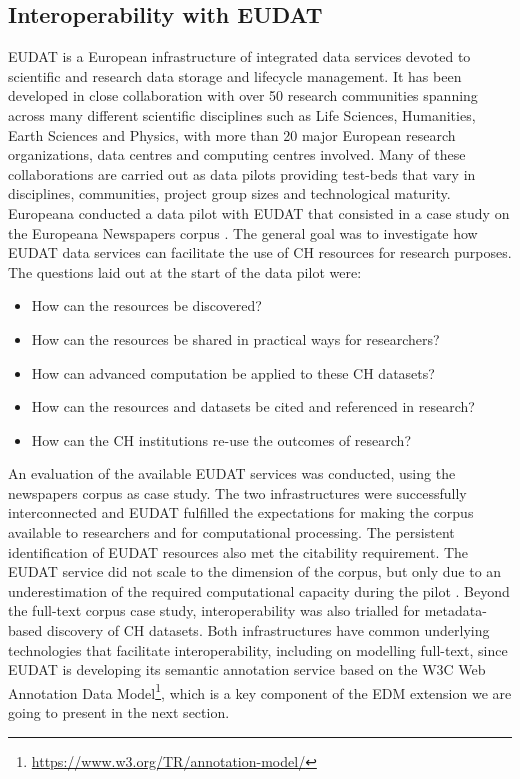 \documentclass[a4paper,UKenglish,cleveref, autoref]{oasics-v2019}
\begin{document}
\subsection{Interoperability with EUDAT}
\label{sec:interoperabilitywitheudat}
EUDAT is a European infrastructure of integrated data services devoted to scientific and research data storage and lifecycle management. It has been developed in close collaboration with over 50 research communities spanning across many different scientific disciplines such as Life Sciences, Humanities, Earth Sciences and Physics, with more than 20 major European research organizations, data centres and computing centres involved. Many of these collaborations are carried out as data pilots providing test-beds that vary in disciplines, communities, project group sizes and technological maturity. Europeana conducted a data pilot with EUDAT that consisted in a case study on the Europeana Newspapers corpus \cite{Dugenie2017}. The general goal was to investigate how EUDAT data services can facilitate the use of CH resources for research purposes. The questions laid out at the start of the data pilot were:
\begin{itemize}
\item How can the resources be discovered?
\item How can the resources be shared in practical ways for researchers? 
\item How can advanced computation be applied to these CH datasets? 
\item How can the resources and datasets be cited and referenced in research?
\item How can the CH institutions re-use the outcomes of research?
\end{itemize}

An evaluation of the available EUDAT services was conducted, using the newspapers corpus as case study. The two infrastructures were successfully interconnected and EUDAT fulfilled the expectations for making the corpus available to researchers and for computational processing. The persistent identification of EUDAT resources also met the citability requirement. The EUDAT service did not scale to the dimension of the corpus, but only due to an underestimation of the required computational capacity during the pilot \cite{Dugenie2017}. Beyond the full-text corpus case study, interoperability was also trialled for metadata-based discovery of CH datasets. Both infrastructures have common underlying technologies that facilitate interoperability, including on modelling full-text, since EUDAT is developing its semantic annotation service based on the W3C Web Annotation Data 
Model\footnote{\url{https://www.w3.org/TR/annotation-model/}},
which is a key component of the EDM extension we are going to present in the next section.
\end{document}
